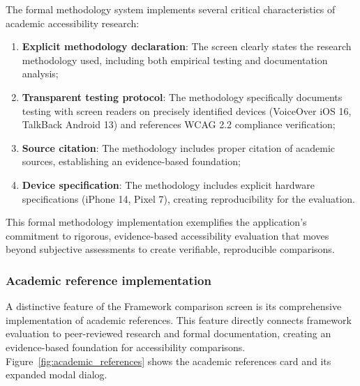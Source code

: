 The formal methodology system implements several critical characteristics of academic accessibility research:

\begin{enumerate}
    \item \textbf{Explicit methodology declaration}: The screen clearly states the research methodology used, including both empirical testing and documentation analysis;
    
    \item \textbf{Transparent testing protocol}: The methodology specifically documents testing with screen readers on precisely identified devices (VoiceOver iOS 16, TalkBack Android 13) and references WCAG 2.2 compliance verification;
    
    \item \textbf{Source citation}: The methodology includes proper citation of academic sources, establishing an evidence-based foundation;
    
    \item \textbf{Device specification}: The methodology includes explicit hardware specifications (iPhone 14, Pixel 7), creating reproducibility for the evaluation.
\end{enumerate}

This formal methodology implementation exemplifies the application's commitment to rigorous, evidence-based accessibility evaluation that moves beyond subjective assessments to create verifiable, reproducible comparisons.

\subsubsection{Academic reference implementation}

A distinctive feature of the Framework comparison screen is its comprehensive implementation of academic references. This feature directly connects framework evaluation to peer-reviewed research and formal documentation, creating an evidence-based foundation for accessibility comparisons. Figure~\ref{fig:academic_references} shows the academic references card and its expanded modal dialog.

